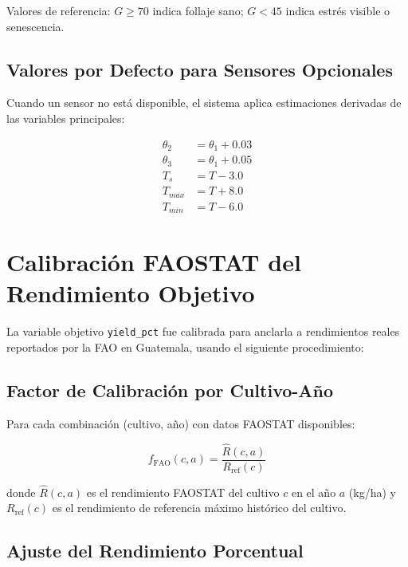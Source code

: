 \documentclass[12pt, a4paper]{article}
\newcommand{\feat}[1]{\texttt{#1}}
\begin{document}
Valores de referencia: $G \geq 70$ indica follaje sano; $G < 45$ indica estrés visible o senescencia.

\subsection{Valores por Defecto para Sensores Opcionales}

Cuando un sensor no está disponible, el sistema aplica estimaciones derivadas de las variables principales:

\begin{align}
  \theta_2 &= \theta_1 + 0.03 \label{eq:swvl2} \\
  \theta_3 &= \theta_1 + 0.05 \label{eq:swvl3} \\
  T_s      &= T - 3.0         \label{eq:soil_temp} \\
  T_{max}  &= T + 8.0         \label{eq:temp_max} \\
  T_{min}  &= T - 6.0         \label{eq:temp_min}
\end{align}

\section{Calibración FAOSTAT del Rendimiento Objetivo}

La variable objetivo \feat{yield\_pct} fue calibrada para anclarla a rendimientos reales reportados por la FAO en Guatemala, usando el siguiente procedimiento:

\subsection{Factor de Calibración por Cultivo-Año}

Para cada combinación (cultivo, año) con datos FAOSTAT disponibles:

\begin{equation}
  f_{\text{FAO}}(c, a) = \frac{\hat{R}(c, a)}{R_{\text{ref}}(c)}
  \label{eq:fao_factor}
\end{equation}

donde $\hat{R}(c, a)$ es el rendimiento FAOSTAT del cultivo $c$ en el año $a$ (kg/ha) y $R_{\text{ref}}(c)$ es el rendimiento de referencia máximo histórico del cultivo.

\subsection{Ajuste del Rendimiento Porcentual}
\end{document}
